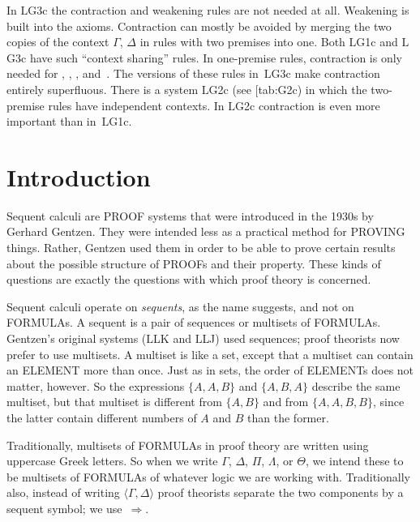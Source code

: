 \documentclass[10pt,a4paper]{article}
\makeatletter
\newcommand*{\olup}[1]{\MakeUppercase{#1}}
\theoremstyle{plain}
\theoremstyle{definition}
\theoremstyle{remark}
\newcommand*{\olfileid}[3]{}
\newcommand*{\olsection}[1]{\section*{#1}}
\newcommand{\olref}{\@ifnextchar[{\olref@i}{\olref@final}}
\def\olref@i[#1]{\@ifnextchar[{\olref@ii}{\olref@final}}
\def\olref@ii[#1]{\@ifnextchar[{\olref@iii}{\olref@final}}
\def\olref@iii[#1]{\olref@final}
\def\olref@final#1{\ref{#1}}
\providecommand{\lforall}{\mathord{\forall}}
\providecommand{\lexists}{\mathord{\exists}}
\providecommand{\Sequent}{\mathrel{\Rightarrow}}
\providecommand{\Log}{\ensuremath{\mathrm{L}}}
\providecommand{\tuple}[1]{\langle #1 \rangle}
\providecommand{\LeftR}[1]{}
\providecommand{\RightR}[1]{}
\providecommand{\RightR}{\mathrm{R}}
\providecommand{\LeftR}{\mathrm{L}}
\makeatother
\begin{document}
In \Log{G3c} the contraction and weakening rules are not needed at
all. Weakening is built into the axioms. Contraction can mostly be
avoided by merging the two copies of the context $\Gamma$, $\Delta$ in
rules with two premises into one. Both \Log{G1c} and \Log{G3c} have
such ``context sharing'' rules. In one-premise rules, contraction is
only needed for \RightR{\lor}, \LeftR{\land}, \RightR{\lexists},
and~\LeftR{\lforall}. The versions of these rules in~\Log{G3c} make
contraction entirely superfluous. There is a system \Log{G2c} (see
\olref{tab:G2c}) in which the two-premise rules have independent
contexts. In \Log{G2c} contraction is even more important than
in~\Log{G1c}.






\olfileid{pt}{seq}{int}

\olsection{Introduction}

Sequent calculi are \olup{proof} systems that were introduced in the
1930s by Gerhard Gentzen. They were intended less as a practical
method for \olup{proving} things. Rather, Gentzen used them in order to
be able to prove certain results about the possible structure of
\olup{proof}s and their property. These kinds of questions are
exactly the questions with which proof theory is concerned.

Sequent calculi operate on \emph{sequents}, as the name suggests, and
not on \olup{formula}s. A sequent is a pair of sequences or multisets of
\olup{formula}s. Gentzen's original systems (\Log{LK} and \Log{LJ}) used
sequences; proof theorists now prefer to use multisets. A multiset is
like a set, except that a multiset can contain an \olup{element} more
than once. Just as in sets, the order of \olup{element}s does not matter,
however. So the expressions $\{A, A, B\}$ and $\{A, B, A\}$
describe the same multiset, but that multiset is different from $\{A,
B\}$ and from $\{A, A, B, B\}$, since the latter contain
different numbers of $A$ and $B$ than the former.

Traditionally, multisets of \olup{formula}s in proof theory are written
using uppercase Greek letters. So when we write $\Gamma$, $\Delta$,
$\Pi$, $\Lambda$, or $\Theta$, we intend these to be multisets of
\olup{formula}s of whatever logic we are working with. Traditionally
also, instead of writing $\tuple{\Gamma, \Delta}$ proof theorists
separate the two components by a sequent symbol; we use~$\Sequent$. 
\end{document}
